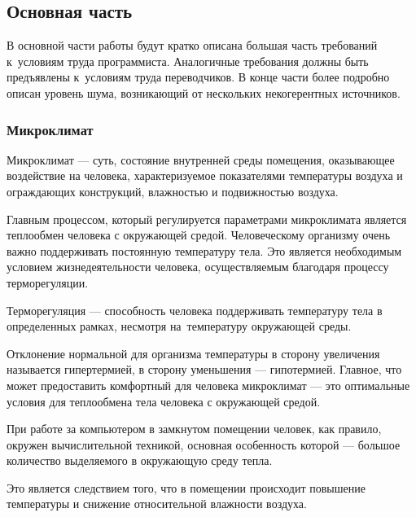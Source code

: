 
\subsection{Основная часть}

В основной части работы будут кратко описана большая часть требований 
к~условиям труда программиста. 
Аналогичные требования должны быть предъявлены
к~условиям труда переводчиков.
В конце части более подробно описан  уровень шума, 
возникающий от нескольких некогерентных источников.

\subsubsection{Микроклимат}

Микроклимат --- суть, состояние внутренней среды помещения, оказывающее воздействие 
на человека, характеризуемое показателями температуры воздуха 
и ограждающих конструкций, влажностью и подвижностью воздуха.


Главным процессом, который регулируется параметрами микроклимата
является теплообмен человека с окружающей средой. 
Человеческому организму очень важно поддерживать постоянную температуру тела.
Это является необходимым условием жизнедеятельности человека, 
осуществляемым благодаря процессу терморегуляции. 

Терморегуляция --- способность человека поддерживать температуру тела в определенных рамках, несмотря 
на~температуру окружающей среды. 

Отклонение нормальной для организма температуры в сторону увеличения называется гипертермией, 
в сторону уменьшения --- гипотермией. 
Главное, что может предоставить комфортный для человека микроклимат 
--- это оптимальные условия для теплообмена тела человека с окружающей средой.

При работе за компьютером в замкнутом помещении человек, как правило, 
окружен вычислительной техникой, основная особенность которой 
--- большое количество выделяемого в окружающую среду тепла. 

Это является следствием того, что в помещении происходит повышение температуры 
и снижение относительной влажности воздуха. 

